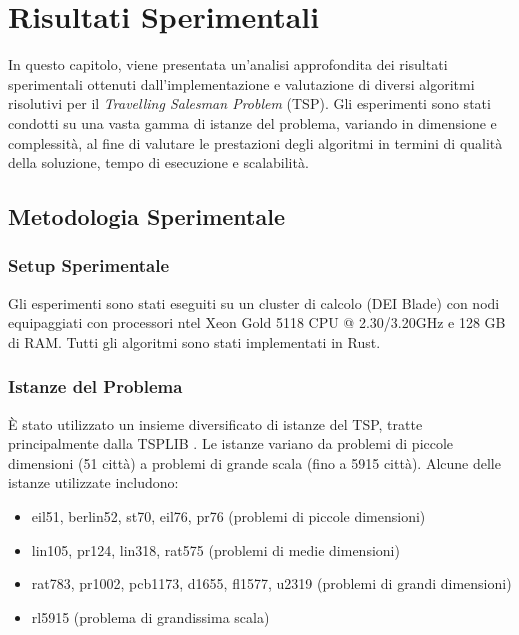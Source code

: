 
%

\chapter{Risultati Sperimentali}
\label{chapt:7}

In questo capitolo, viene presentata un'analisi approfondita dei risultati sperimentali ottenuti dall'implementazione e valutazione di diversi algoritmi risolutivi per il \textit{Travelling Salesman Problem} (TSP). Gli esperimenti sono stati condotti su una vasta gamma di istanze del problema, variando in dimensione e complessità, al fine di valutare le prestazioni degli algoritmi in termini di qualità della soluzione, tempo di esecuzione e scalabilità.

\section{Metodologia Sperimentale}
\label{sec:metodologia}

\subsection{Setup Sperimentale}
Gli esperimenti sono stati eseguiti su un cluster di calcolo (DEI Blade) con nodi equipaggiati con processori ntel Xeon Gold 5118 CPU @ 2.30/3.20GHz e 128 GB di RAM. Tutti gli algoritmi sono stati implementati in Rust.

\subsection{Istanze del Problema}
È stato utilizzato un insieme diversificato di istanze del TSP, tratte principalmente dalla TSPLIB \cite{TSPLIB}. Le istanze variano da problemi di piccole dimensioni (51 città) a problemi di grande scala (fino a 5915 città). Alcune delle istanze utilizzate includono:

\begin{itemize}
	\item eil51, berlin52, st70, eil76, pr76 (problemi di piccole dimensioni)
	\item lin105, pr124, lin318, rat575 (problemi di medie dimensioni)
	\item rat783, pr1002, pcb1173, d1655, fl1577, u2319 (problemi di grandi dimensioni)
	\item rl5915 (problema di grandissima scala)
\end{itemize}

